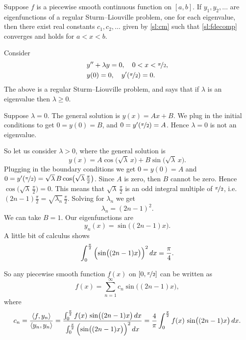 \begin{theorem}
Suppose $f$ is a piecewise smooth continuous function on $[a,b]$.  If $y_1,
y_2, \ldots$ are eigenfunctions of a regular Sturm--Liouville problem,
one for each eigenvalue,
then there exist real constants $c_1, c_2, \ldots$ given by \eqref{sl:cm}
such that
\eqref{sl:fdecomp} converges and holds for $a < x < b$.
\end{theorem}

\begin{example}
Consider
\begin{align*}
& y'' + \lambda y = 0, \quad 0 < x < \nicefrac{\pi}{2} , \\
& y(0) =0, \quad y'(\nicefrac{\pi}{2}) = 0 .
\end{align*}
The above is a regular Sturm--Liouville problem, and
says that if $\lambda$ is an eigenvalue then
$\lambda \geq 0$.

Suppose $\lambda = 0$.  The general solution is $y(x) = Ax + B$.
We plug in the
initial conditions to get $0=y(0) = B$, and $0 = y'(\nicefrac{\pi}{2}) = A$.
Hence $\lambda = 0$ is not an eigenvalue.

So let us consider $\lambda > 0$, where
the general solution is
\begin{equation*}
y(x) = A \cos \bigl( \sqrt{\lambda} \, x \bigr)
+ B \sin \bigl( \sqrt{\lambda} \, x \bigr) .
\end{equation*}
Plugging in the boundary conditions we get
$0 = y(0) = A$ and $0 = y'(\nicefrac{\pi}{2})
= \sqrt{\lambda} \, B \cos \bigl(\sqrt{\lambda} \, \frac{\pi}{2}\bigr)$.
Since $A$ is zero, then
$B$ cannot be zero.  Hence $\cos \bigl( \sqrt{\lambda} \,
\frac{\pi}{2}\bigr) = 0$.
This means that
$\sqrt{\lambda} \,\frac{\pi}{2}$ is an odd integral multiple of
$\nicefrac{\pi}{2}$,
i.e.\ $(2n-1)\frac{\pi}{2} = \sqrt{\lambda_n} \,\frac{\pi}{2}$.
Solving for $\lambda_n$ we get
\begin{equation*}
\lambda_n = {(2n-1)}^2 .
\end{equation*}
We can take $B = 1$.  Our eigenfunctions are
\begin{equation*}
y_n(x) = \sin \bigl( (2n-1)x \bigr) .
\end{equation*}
A little bit of calculus shows
\begin{equation*}
\int_0^{\frac{\pi}{2}} {\Bigl( \sin \bigl( (2n-1)x \bigr) \Bigr)}^2 \, dx
= \frac{\pi}{4} .
\end{equation*}

So any piecewise smooth function $f(x)$ on $[0,\nicefrac{\pi}{2}]$ can be written as
\begin{equation*}
f(x) = \sum_{n=1}^\infty c_n \sin \bigl( (2n-1)x \bigr) ,
\end{equation*}
where
\begin{equation*}
c_n = \frac{\langle f , y_n \rangle}{\langle y_n , y_n \rangle}
= \frac{\int_0^{\frac{\pi}{2}} f(x) \, \sin \bigl( (2n-1)x \bigr) \, dx
}{\int_0^{\frac{\pi}{2}} {\Bigl(\sin \bigl((2n-1)x\bigr)\Bigr)}^2 \, dx}
= \frac{4}{\pi} \int_0^{\frac{\pi}{2}} f(x) \,\sin \bigl( (2n-1)x \bigr) \, dx .
\end{equation*}


\end{example}
